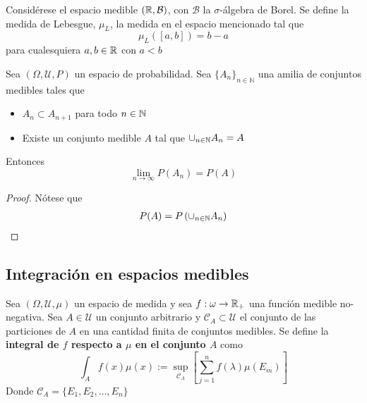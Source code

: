 \begin{definicion}
Considérese el espacio medible $(\mathbb{R}, \mathcal{B})$, con $\mathcal{B}$ la $\sigma$-álgebra de Borel. Se define la medida de Lebesgue, $\mu_L$, la medida en el espacio mencionado tal que 
\begin{equation}
\mu_L([a,b]) = b-a
\end{equation}
para cualesquiera $a,b \in \mathbb{R}$ con $a<b$
\end{definicion}

\begin{proposicion}
Sea $(\Omega,\mathcal{U},P)$ un espacio de probabilidad. Sea $\{ A_n \}_{n\in \mathbb{N}}$ una amilia de conjuntos medibles tales que 
\begin{itemize}
\item $A_n \subset A_{n+1}$ para todo $n \in \mathbb{N}$
\item Existe un conjunto medible $A$ tal que $\cup_{n\in \mathbb{N}} A_n = A$
\end{itemize}
Entonces
\begin{equation}
\lim_{n\rightarrow \infty} P(A_n) = P(A)
\end{equation}
\end{proposicion}
\begin{proof}
Nótese que
\begin{align*}
P(A) &= P\left( \cup_{n\in \mathbb{N}} A_n \right) \\
\end{align*}
\end{proof}

\subsection{Integración en espacios medibles}

\begin{definicion}
Sea $(\Omega, \mathcal{U}, \mu)$ un espacio de medida y sea $f:\omega \rightarrow \mathbb{R}_+$ una función medible no-negativa. Sea $A\in \mathcal{U}$ un conjunto arbitrario y $\mathcal{C}_A \subset \mathcal{U}$ el conjunto de las particiones de $A$ en una cantidad finita de conjuntos medibles.
Se define la \textbf{integral de $f$ respecto a $\mu$ en el conjunto $A$} como
\begin{equation}
\int_A f(x) \mu(x) := \sup_{\mathcal{C}_A} \left[ \sum_{j=1}^{n} f(\lambda) \mu(E_m) \right]
\end{equation}
Donde $\mathcal{C}_A = \{ E_1, E_2, \dots, E_n \}$
\end{definicion}

